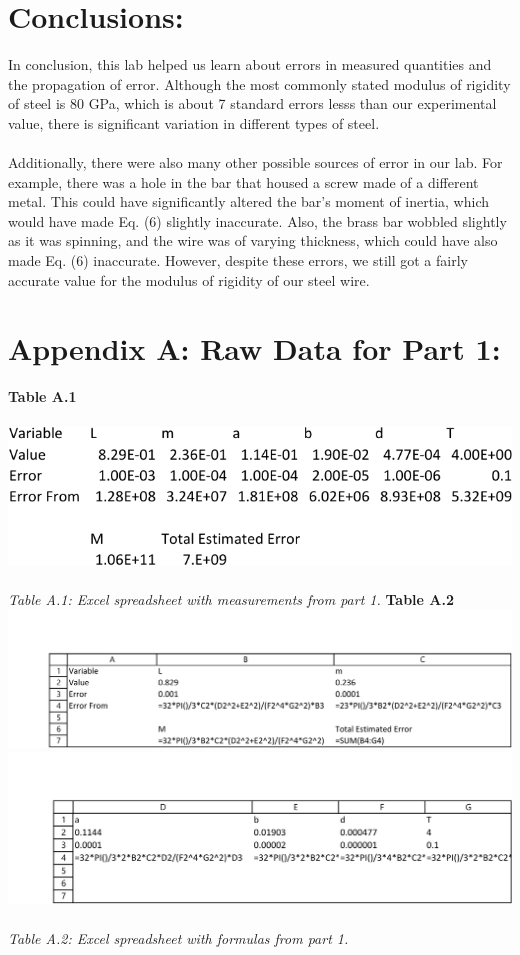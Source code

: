 \documentclass[leqno]{article}
\begin{document}
\section*{Conclusions:}
In conclusion, this lab helped us learn about errors in measured quantities and the propagation of error.  Although the most commonly stated modulus of rigidity of steel is 80 GPa, which is about 7 standard errors lesss than our experimental value, there is significant variation in different types of steel.\\\\
 Additionally, there were also many other possible sources of error in our lab.  For example, there was a hole in the bar that housed a screw made of a different metal.  This could have significantly altered the bar's moment of inertia, which would have made Eq. (6) slightly inaccurate.  Also, the brass bar wobbled slightly as it was spinning, and the wire was of varying thickness, which could have also made Eq. (6) inaccurate.  However, despite these errors, we still got a fairly accurate value for the modulus of rigidity of our steel wire.
\newpage
\section*{Appendix A: Raw Data for Part 1:}
\noindent
\textbf{Table A.1}\\\\
\includegraphics[width=\linewidth]{lab1dataa-crop}\\\\
\textit{\small Table A.1: Excel spreadsheet with measurements from part 1.}
\newpage
\textbf{Table A.2}\\
\includegraphics[width=\linewidth]{lab1dataaf1-crop}
\includegraphics[width=\linewidth]{lab1dataaf2-crop}\\\\
\textit{\small Table A.2: Excel spreadsheet with formulas from part 1.}
\newpage
\end{document}
